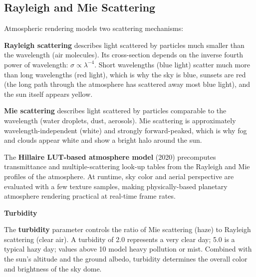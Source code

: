 \documentclass[
  11pt,
  letterpaper,
  DIV=11,
  numbers=noendperiod,
  twoside,
  open=right]{scrreprt}
\begin{document}
\subsection{Rayleigh and Mie
Scattering}\label{rayleigh-and-mie-scattering}

Atmospheric rendering models two scattering mechanisms:

\textbf{Rayleigh scattering} describes light scattered by particles much
smaller than the wavelength (air molecules). Its cross-section depends
on the inverse fourth power of wavelength:
\(\sigma \propto \lambda^{-4}\). Short wavelengths (blue light) scatter
much more than long wavelengths (red light), which is why the sky is
blue, sunsets are red (the long path through the atmosphere has
scattered away most blue light), and the sun itself appears yellow.

\textbf{Mie scattering} describes light scattered by particles
comparable to the wavelength (water droplets, dust, aerosols). Mie
scattering is approximately wavelength-independent (white) and strongly
forward-peaked, which is why fog and clouds appear white and show a
bright halo around the sun.

The \textbf{Hillaire LUT-based atmosphere model} (2020) precomputes
transmittance and multiple-scattering look-up tables from the Rayleigh
and Mie profiles of the atmosphere. At runtime, sky color and aerial
perspective are evaluated with a few texture samples, making
physically-based planetary atmosphere rendering practical at real-time
frame rates.

\begin{tcolorbox}[enhanced jigsaw, arc=.35mm, bottomrule=.15mm, breakable, colback=white, colframe=quarto-callout-note-color-frame, left=2mm, leftrule=.75mm, opacityback=0, rightrule=.15mm, toprule=.15mm]
\begin{minipage}[t]{5.5mm}
\textcolor{quarto-callout-note-color}{\faInfo}
\end{minipage}%
\begin{minipage}[t]{\textwidth - 5.5mm}

\vspace{-3mm}\textbf{Turbidity}\vspace{3mm}

The \textbf{turbidity} parameter controls the ratio of Mie scattering
(haze) to Rayleigh scattering (clear air). A turbidity of 2.0 represents
a very clear day; 5.0 is a typical hazy day; values above 10 model heavy
pollution or mist. Combined with the sun's altitude and the ground
albedo, turbidity determines the overall color and brightness of the sky
dome.

\end{minipage}%
\end{tcolorbox}
\end{document}
